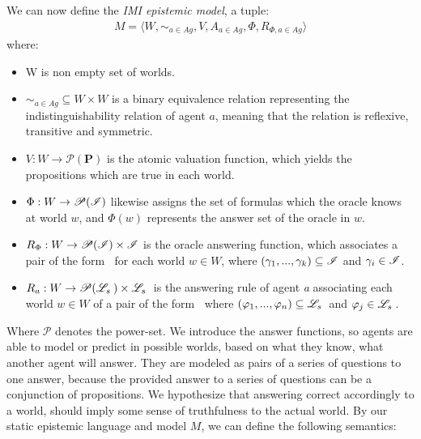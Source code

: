 We can now define the \textit{IMI epistemic model}, a tuple:
\begin{align}
	M = \langle W, \sim_{a\in Ag}, V, A_{a\in Ag}, \Phi, R_{\Phi, a\in Ag}\rangle
\end{align}
where:
\begin{itemize}
	\setlength\itemsep{-0.4em}
	\item W is non empty set of worlds.
	\item $\sim_{a\in Ag} \subseteq W \times W$ is a binary equivalence relation representing the indistinguishability relation of agent $a$, meaning that the relation is reflexive, transitive and symmetric.
	\item $V : W \rightarrow \mathscr{P}(\mathbf{P})$ is the atomic valuation function, which yields the propositions which are true in each world. 
	\item $\Phi : W \rightarrow \mathscr{P}(\mathscr{I}) $ likewise assigns the set of formulas which the oracle knows at world $w$, and $\Phi(w)$ represents the answer set of the oracle in $w$.
	\item $R_{\Phi} : W \rightarrow \mathscr{P}(\mathscr{I}) \times \mathscr{I}$ is the oracle answering function, which associates a pair of the form \oset $\:$ for each world $w \in W$, where $(\gamma_1,...,\gamma_k) \subseteq \mathscr{I}$ and $\gamma_i \in \mathscr{I}$.
	\item $R_a : W \rightarrow \mathscr{P}(\mathscr{L}_s \:) \times \mathscr{L}_s \:$ is the answering rule of agent \textit{a} associating each world $w \in W$ of a pair of the form \aset $\:$ where $(\varphi_1,...,\varphi_n) \subseteq \mathscr{L}_s \:$ and $\varphi_j \in \mathscr{L}_s \:$.
\end{itemize}
Where $\mathscr{P}$ denotes the power-set. We introduce the answer functions, so agents are able to model or predict in possible worlds, based on what they know, what another agent will answer. They are modeled as pairs of a series of questions to one answer, because the provided answer to a series of questions can be a conjunction of propositions. We hypothesize that answering correct accordingly to a world, should imply some sense of truthfulness to the actual world. By our static epistemic language \staticlang and model $M$, we can define the following semantics:

